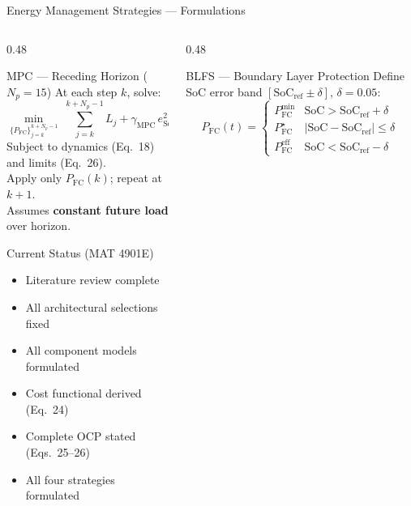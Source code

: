 \documentclass[aspectratio=169, 10pt]{beamer}
\newcommand{\PFC}{P_{\mathrm{FC}}}
\newcommand{\SoC}{\mathrm{SoC}}
\begin{document}
\begin{frame}{Energy Management Strategies — Formulations}
  \begin{columns}[T]
    \begin{column}{0.48\textwidth}
      \begin{block}{MPC — Receding Horizon ($N_p = 15$)}
        At each step $k$, solve:
        \[
          \min_{\{\PFC\}_{j=k}^{k+N_p-1}}\;
          \sum_{j=k}^{k+N_p-1} L_j + \gamma_{\mathrm{MPC}}\,e_{\SoC,k+N_p}^2
        \]
        Subject to dynamics (Eq.\ 18) and limits (Eq.\ 26). \\
        Apply only $\PFC(k)$; repeat at $k+1$. \\
        Assumes \textbf{constant future load} over horizon.
      \end{block}
      \vspace{4pt}
      \begin{block}{Current Status (MAT 4901E)}
        \begin{itemize}
          \item[$\checkmark$] Literature review complete
          \item[$\checkmark$] All architectural selections fixed
          \item[$\checkmark$] All component models formulated
          \item[$\checkmark$] Cost functional derived (Eq.\ 24)
          \item[$\checkmark$] Complete OCP stated (Eqs.\ 25–26)
          \item[$\checkmark$] All four strategies formulated
        \end{itemize}
      \end{block}
    \end{column}
    \begin{column}{0.48\textwidth}
      \begin{block}{BLFS — Boundary Layer Protection}
        Define SoC error band $[\SoC_{\mathrm{ref}}\pm\delta]$, $\delta=0.05$:
        \[
          \PFC(t) = \begin{cases}
            \PFC^{\min} & \SoC > \SoC_{\mathrm{ref}} + \delta \\
            \PFC^{\star} & |\SoC - \SoC_{\mathrm{ref}}| \le \delta \\
            \PFC^{\mathrm{eff}} & \SoC < \SoC_{\mathrm{ref}} - \delta
          \end{cases}
\]
\end{block}
\end{column}
\end{columns}
\end{frame}
\end{document}
